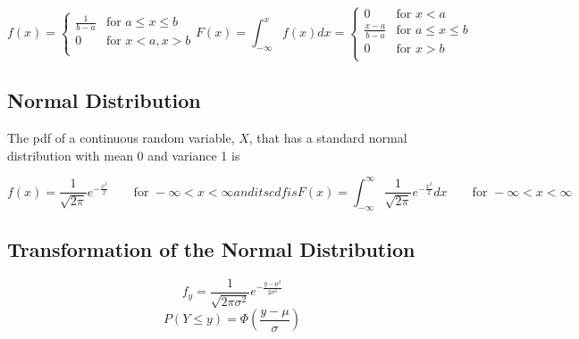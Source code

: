 \begin{subequations}
  \begin{equation}
    f(x) =  \begin{cases}
              \frac{1}{b-a} & \text{for } a \leq x \leq b \\
              0 & \text{for } x < a, x>b  \\
            \end{cases}
  \end{equation}
  \begin{equation}
    F(x) = \int^x_{-\infty}f(x)dx = \begin{cases}
                                      0 & \text{for } x < a \\
                                      \frac{x-a}{b-a} & \text{for } a \leq x \leq b \\
                                      0 & \text{for } x > b \\
                                    \end{cases}
  \end{equation}
\end{subequations}


\subsection{Normal Distribution} %
\label{sub:normal_distribution}
The pdf of a continuous random variable, $X$, that has a standard normal distribution with mean 0 and variance 1 is

\begin{subequations}
\begin{equation}
  f(x) = \frac{1}{\sqrt{2\pi}}e^{-\frac{x^2}{2}} \qquad \text{for }  -\infty < x <\infty
\end{equation}
and its cdf is
\begin{equation}
  F(x) = \int^\infty_{-\infty}\frac{1}{\sqrt{2\pi}}e^{-\frac{x^2}{2}}dx \qquad \text{for }  -\infty < x <\infty
\end{equation}
\end{subequations}


\subsection{Transformation of the Normal Distribution} %
\label{sub:transformation_of_the_normal_distribution}

\begin{equation}
  f_y = \frac{1}{\sqrt{2\pi\sigma^2}}e^{-\frac{y-\mu^2}{2\sigma^2}}
\end{equation}
\begin{equation}
  P(Y \leq y) = \Phi (\frac{y - \mu}{\sigma}) 
\end{equation}


